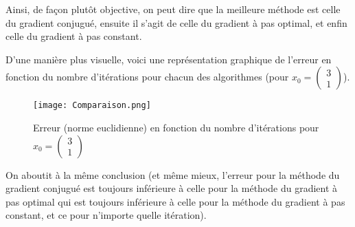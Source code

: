 \documentclass[9pt,a4paper]{article}
\begin{document}
Ainsi, de façon plutôt objective, on peut dire que la meilleure méthode est celle du gradient conjugué, ensuite il s'agit de celle du gradient à pas optimal, et enfin celle du gradient à pas constant.\newpage

D'une manière plus visuelle, voici une représentation graphique de l'erreur en fonction du nombre d'itérations pour chacun des algorithmes (pour $x_0 =
\begin{pmatrix}
    3\\
    1
\end{pmatrix}$).
\begin{figure}[h]
    \centering
    \texttt{[image: Comparaison.png]}
    \caption{Erreur (norme euclidienne) en fonction du nombre d'itérations pour $x_0 =
\begin{pmatrix}
    3\\
    1
\end{pmatrix}$}
    \label{fig:enter-label}
\end{figure}\newline
On aboutit à la même conclusion (et même mieux, l'erreur pour la méthode du gradient conjugué est toujours inférieure à celle pour la méthode du gradient à pas optimal qui est toujours inférieure à celle pour la méthode du gradient à pas constant, et ce pour n'importe quelle itération).
\end{document}
